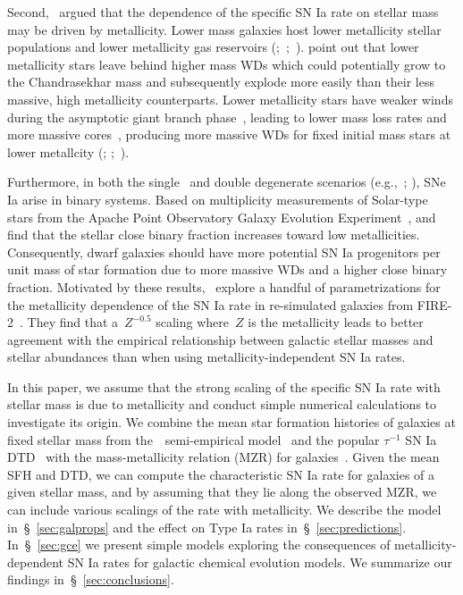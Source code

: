 \documentclass[foo.tex]{subfiles}
\begin{document}
Second,~\citet{Kistler2013} argued that the dependence of the specific SN Ia
rate on stellar mass may be driven by metallicity.
Lower mass galaxies host lower metallicity stellar populations
\citep{Gallazzi2005, Kirby2013, Simon2019} and lower metallicity gas reservoirs
(\citealp{Tremonti2004};~\citealp*{Zahid2011};~\citealp{Andrews2013,
Zahid2014}).
\citet{Kistler2013} point out that lower metallicity stars leave behind higher
mass WDs which could potentially grow to the Chandrasekhar mass and
subsequently explode more easily than their less massive, high metallicity
counterparts.
Lower metallicity stars have weaker winds during the asymptotic giant branch
phase~\citep{Willson2000, Marigo2007}, leading to lower mass loss rates and
more massive cores~\citep{Kalirai2014}, producing more massive WDs for fixed
initial mass stars at lower metallcity (\citealp{Umeda1999};
\citealp*{Meng2008};~\citealp{Zhao2012}).
\par
Furthermore, in both the single~\citep[e.g.,][]{Whelan1973} and double
degenerate scenarios (e.g.,~\mbox{\citealp{Iben1984}};
\mbox{\citealp{Webbink1984}}), SNe Ia arise in binary systems.
Based on multiplicity measurements of Solar-type stars from the Apache Point
Observatory Galaxy Evolution Experiment~\citep[APOGEE;][]{Majewski2017},
\citet{Badenes2018} and~\citet*{Moe2019} find that the stellar close binary
fraction increases toward low metallicities.
Consequently, dwarf galaxies should have more potential SN Ia progenitors per
unit mass of star formation due to more massive WDs and a higher close binary
fraction.
Motivated by these results,~\citet{Gandhi2022} explore a handful of
parametrizations for the metallicity dependence of the SN Ia rate in
re-simulated galaxies from FIRE-2~\citep{Hopkins2018}.
They find that a~$Z^{-0.5}$ scaling where~$Z$ is the metallicity leads
to better agreement with the empirical relationship between galactic stellar
masses and stellar abundances than when using metallicity-independent SN Ia
rates.
\par
In this paper, we assume that the strong scaling of the specific SN Ia rate
with stellar mass is due to metallicity and conduct simple numerical
calculations to investigate its origin.
We combine the mean star formation histories of galaxies at fixed stellar
mass from the~\um~semi-empirical model~\citep{Behroozi2019} and the popular
$\tau^{-1}$ SN Ia DTD~\citep[e.g.,][]{Maoz2012a} with the mass-metallicity
relation (MZR) for galaxies~\citep{Tremonti2004, Andrews2013, Zahid2011,
Zahid2014}.
Given the mean SFH and DTD, we can compute the characteristic SN Ia rate for
galaxies of a given stellar mass, and by assuming that they lie along the
observed MZR, we can include various scalings of the rate with metallicity.
We describe the model in~\S~\ref{sec:galprops} and the effect on Type Ia rates
in~\S~\ref{sec:predictions}.
In~\S~\ref{sec:gce} we present simple models exploring the consequences of
metallicity-dependent SN Ia rates for galactic chemical evolution models.
We summarize our findings in~\S~\ref{sec:conclusions}.
\end{document}
